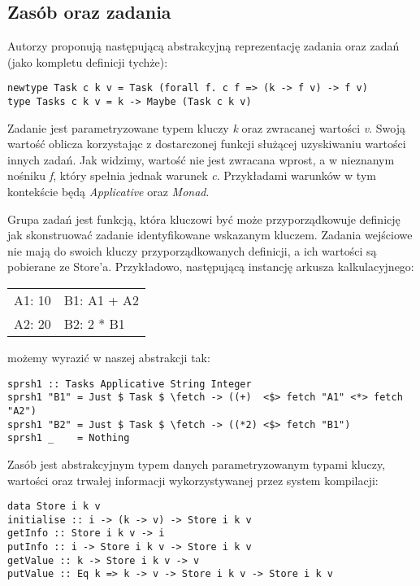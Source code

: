 \subsection{Zasób oraz zadania}

\lstset{style=haskell-style}

Autorzy proponują następującą abstrakcyjną reprezentację zadania oraz zadań (jako kompletu definicji tychże):

\begin{lstlisting}
newtype Task c k v = Task (forall f. c f => (k -> f v) -> f v)
type Tasks c k v = k -> Maybe (Task c k v)
\end{lstlisting}

Zadanie jest parametryzowane typem kluczy \textit{k} oraz zwracanej wartości \textit{v}. Swoją wartość oblicza korzystając z dostarczonej funkcji służącej uzyskiwaniu wartości innych zadań. Jak widzimy, wartość nie jest zwracana wprost, a w nieznanym nośniku \textit{f}, który spełnia jednak warunek \textit{c}. Przykładami warunków w tym kontekście będą \textit{Applicative} oraz \textit{Monad}.

Grupa zadań jest funkcją, która kluczowi być może przyporządkowuje definicję jak skonstruować zadanie identyfikowane wskazanym kluczem. Zadania wejściowe nie mają do swoich kluczy przyporządkowanych definicji, a ich wartości są pobierane ze Store'a. Przykładowo, następującą instancję arkusza kalkulacyjnego:

\begin{tabular}{ l l }
  A1: 10 & B1: A1 + A2 \\
  A2: 20 & B2: 2 * B1
\end{tabular}

możemy wyrazić w naszej abstrakcji tak:

\begin{lstlisting}
sprsh1 :: Tasks Applicative String Integer
sprsh1 "B1" = Just $ Task $ \fetch -> ((+)  <$> fetch "A1" <*> fetch "A2")
sprsh1 "B2" = Just $ Task $ \fetch -> ((*2) <$> fetch "B1")
sprsh1 _    = Nothing
\end{lstlisting}

Zasób jest abstrakcyjnym typem danych parametryzowanym typami kluczy, wartości oraz trwałej informacji wykorzystywanej przez system kompilacji:

\begin{lstlisting}
data Store i k v
initialise :: i -> (k -> v) -> Store i k v
getInfo :: Store i k v -> i
putInfo :: i -> Store i k v -> Store i k v
getValue :: k -> Store i k v -> v
putValue :: Eq k => k -> v -> Store i k v -> Store i k v
\end{lstlisting}

